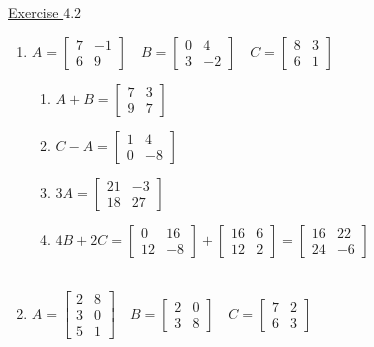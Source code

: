 \documentclass{./../../Latex/handout}
\begin{document}
\thispagestyle{plain}

\underline{Exercise $4.2$}

\begin{enumerate}	
  \item $A=\left[\begin{array}{cc}7 & -1 \\ 6 & 9\end{array}\right] \quad B=\left[\begin{array}{cc}0 & 4 \\ 3 & -2\end{array}\right] \quad C=\left[\begin{array}{ll}8 & 3 \\ 6 & 1\end{array}\right]$
\begin{enumerate}
\item  $A+B=\left[\begin{array}{ll}7 & 3 \\ 9 & 7\end{array}\right]$
\item  $C-A=\left[\begin{array}{cc}1 & 4 \\ 0 & -8\end{array}\right]$
\item  $3 A=\left[\begin{array}{cc}21 & -3 \\ 18 & 27\end{array}\right]$
\item  $4 B+2 C=\left[\begin{array}{cc}0 & 16 \\ 12 & -8\end{array}\right]+\left[\begin{array}{cc}16 & 6 \\ 12 & 2\end{array}\right]=\left[\begin{array}{cc}16 & 22 \\ 24 & -6\end{array}\right]$ \\~\\
\end{enumerate} 

\item $A = \left[\begin{array}{cc}
2 & 8 \\
3 & 0 \\
5 & 1
\end{array}\right] \quad B=\left[\begin{array}{cc} 2 & 0 \\ 3 & 8\end{array}\right] \quad
C=\left[\begin{array}{cc} 7 & 2 \\ 6 & 3\end{array}\right]$


\end{enumerate}
\end{document}
